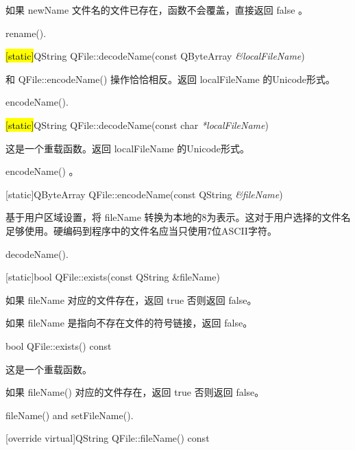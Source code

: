 \begin{notice}
如果 newName 文件名的文件已存在，函数不会覆盖，直接返回 false 。
\end{notice} 

\begin{notice}[另请参阅]
rename().
\end{notice} 

\hl{[static]}QString QFile::decodeName(const QByteArray \emph{\&localFileName})

和 QFile::encodeName() 操作恰恰相反。返回 localFileName 的Unicode形式。


\begin{notice}[另请参阅]
encodeName().
\end{notice} 

\hl{[static]}QString QFile::decodeName(const char \emph{*localFileName})

这是一个重载函数。返回 localFileName 的Unicode形式。


\begin{notice}[另请参阅]
 encodeName() 。
\end{notice} 


[static]QByteArray QFile::encodeName(const QString \emph{\&fileName})

基于用户区域设置，将 fileName 转换为本地的8为表示。这对于用户选择的文件名足够使用。硬编码到程序中的文件名应当只使用7位ASCII字符。


\begin{notice}[另请参阅]
decodeName().
\end{notice} 

[static]bool QFile::exists(const QString \&fileName)

如果 fileName 对应的文件存在，返回 true 否则返回 false。



\begin{notice}
如果 fileName 是指向不存在文件的符号链接，返回 false。
\end{notice} 

bool QFile::exists() const

这是一个重载函数。

如果 fileName() 对应的文件存在，返回 true 否则返回 false。



\begin{notice}[另请参阅]
fileName() and setFileName().
\end{notice} 

[override virtual]QString QFile::fileName() const

